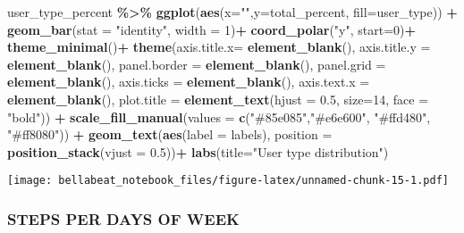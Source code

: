 \documentclass[
]{article}
\newenvironment{Shaded}{\begin{snugshade}}{\end{snugshade}}
\newcommand{\AttributeTok}[1]{\textcolor[rgb]{0.13,0.29,0.53}{#1}}
\newcommand{\DecValTok}[1]{\textcolor[rgb]{0.00,0.00,0.81}{#1}}
\newcommand{\FloatTok}[1]{\textcolor[rgb]{0.00,0.00,0.81}{#1}}
\newcommand{\FunctionTok}[1]{\textcolor[rgb]{0.13,0.29,0.53}{\textbf{#1}}}
\newcommand{\NormalTok}[1]{#1}
\newcommand{\SpecialCharTok}[1]{\textcolor[rgb]{0.81,0.36,0.00}{\textbf{#1}}}
\newcommand{\StringTok}[1]{\textcolor[rgb]{0.31,0.60,0.02}{#1}}
\begin{document}
\begin{Shaded}
\begin{Highlighting}[]
\NormalTok{user\_type\_percent }\SpecialCharTok{\%\textgreater{}\%}
  \FunctionTok{ggplot}\NormalTok{(}\FunctionTok{aes}\NormalTok{(}\AttributeTok{x=}\StringTok{""}\NormalTok{,}\AttributeTok{y=}\NormalTok{total\_percent, }\AttributeTok{fill=}\NormalTok{user\_type)) }\SpecialCharTok{+}
  \FunctionTok{geom\_bar}\NormalTok{(}\AttributeTok{stat =} \StringTok{"identity"}\NormalTok{, }\AttributeTok{width =} \DecValTok{1}\NormalTok{)}\SpecialCharTok{+}
  \FunctionTok{coord\_polar}\NormalTok{(}\StringTok{"y"}\NormalTok{, }\AttributeTok{start=}\DecValTok{0}\NormalTok{)}\SpecialCharTok{+}
  \FunctionTok{theme\_minimal}\NormalTok{()}\SpecialCharTok{+}
  \FunctionTok{theme}\NormalTok{(}\AttributeTok{axis.title.x=} \FunctionTok{element\_blank}\NormalTok{(),}
        \AttributeTok{axis.title.y =} \FunctionTok{element\_blank}\NormalTok{(),}
        \AttributeTok{panel.border =} \FunctionTok{element\_blank}\NormalTok{(), }
        \AttributeTok{panel.grid =} \FunctionTok{element\_blank}\NormalTok{(), }
        \AttributeTok{axis.ticks =} \FunctionTok{element\_blank}\NormalTok{(),}
        \AttributeTok{axis.text.x =} \FunctionTok{element\_blank}\NormalTok{(),}
        \AttributeTok{plot.title =} \FunctionTok{element\_text}\NormalTok{(}\AttributeTok{hjust =} \FloatTok{0.5}\NormalTok{, }\AttributeTok{size=}\DecValTok{14}\NormalTok{, }\AttributeTok{face =} \StringTok{"bold"}\NormalTok{)) }\SpecialCharTok{+}
  \FunctionTok{scale\_fill\_manual}\NormalTok{(}\AttributeTok{values =} \FunctionTok{c}\NormalTok{(}\StringTok{"\#85e085"}\NormalTok{,}\StringTok{"\#e6e600"}\NormalTok{, }\StringTok{"\#ffd480"}\NormalTok{, }\StringTok{"\#ff8080"}\NormalTok{)) }\SpecialCharTok{+}
  \FunctionTok{geom\_text}\NormalTok{(}\FunctionTok{aes}\NormalTok{(}\AttributeTok{label =}\NormalTok{ labels),}
            \AttributeTok{position =} \FunctionTok{position\_stack}\NormalTok{(}\AttributeTok{vjust =} \FloatTok{0.5}\NormalTok{))}\SpecialCharTok{+}
  \FunctionTok{labs}\NormalTok{(}\AttributeTok{title=}\StringTok{"User type distribution"}\NormalTok{)}
\end{Highlighting}
\end{Shaded}

\texttt{[image: bellabeat\_notebook\_files/figure-latex/unnamed-chunk-15-1.pdf]}

\hypertarget{steps-per-days-of-week}{%
\subsubsection{STEPS PER DAYS OF WEEK}\label{steps-per-days-of-week}}
\end{document}
